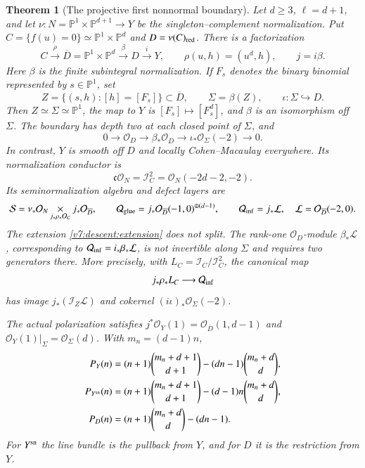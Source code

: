 \documentclass[10pt,fleqn]{article}
\numberwithin{equation}{section}
\newtheorem{theorem}{Theorem}[section]
\newcommand{\PP}{\mathbb P}
\begin{document}
\begin{theorem}[The projective first nonnormal boundary]
\label{v8r11:mixed:projective-first}
Let $d\ge3$, $\ell=d+1$, and let $\nu:N=\PP^1\times\PP^{d+1}\to Y$
be the singleton--complement normalization.  Put
$C=\{f(u)=0\}\simeq\PP^1\times\PP^d$ and $D=\nu(C)_{\rm red}$.
There is a factorization
\[
 C\xrightarrow{\rho}\overline D=\PP^1\times\PP^d
       \xrightarrow{\beta}D\xrightarrow{i}Y,
 \qquad \rho(u,h)=(u^d,h),\qquad j=i\beta.
\]
Here $\beta$ is the finite subintegral normalization.  If $F_s$ denotes
the binary binomial represented by $s\in\PP^1$, set
\[
 Z=\{(s,h):[h]=[F_s]\}\subset\overline D,\qquad
 \Sigma=\beta(Z),\qquad \iota:\Sigma\hookrightarrow D.
\]
Then $Z\simeq\Sigma\simeq\PP^1$, the map to $Y$ is $[F_s]\mapsto[F_s^d]$,
and $\beta$ is an isomorphism off $\Sigma$.  The boundary has depth two
at each closed point of $\Sigma$, and
\[
 0\longrightarrow\mathcal O_D\longrightarrow\beta_*\mathcal O_{\overline D}
   \longrightarrow\iota_*\mathcal O_\Sigma(-2)\longrightarrow0.
\]
In contrast, $Y$ is smooth off $D$ and locally Cohen--Macaulay everywhere.
Its normalization conductor is
\[
 \mathfrak c\mathcal O_N=\mathcal I_C^2
             =\mathcal O_N(-2d-2,-2).
\]
Its seminormalization algebra and defect layers are
\[
 \mathcal S=\nu_*\mathcal O_N
       \mathop{\times}_{j_*\rho_*\mathcal O_C}j_*\mathcal O_{\overline D},
 \qquad
 \mathcal Q_{\rm glue}=j_*\mathcal O_{\overline D}(-1,0)^{\oplus(d-1)},
 \qquad
 \mathcal Q_{\rm inf}=j_*\mathcal L,
 \quad \mathcal L=\mathcal O_{\overline D}(-2,0).
\]
The extension \eqref{v7:descent:extension} does not split.  The rank-one
$\mathcal O_D$-module $\beta_*\mathcal L$, corresponding to
$\mathcal Q_{\rm inf}=i_*\beta_*\mathcal L$, is not invertible along
$\Sigma$ and requires two generators there.  More
precisely, with $L_C=\mathcal I_C/\mathcal I_C^2$, the canonical map
\[
 j_*\rho_*L_C\longrightarrow\mathcal Q_{\rm inf}
\]
has image $j_*(\mathcal I_Z\mathcal L)$ and cokernel
$(i\iota)_*\mathcal O_\Sigma(-2)$.

The actual polarization satisfies
$j^*\mathcal O_Y(1)=\mathcal O_{\overline D}(1,d-1)$ and
$\mathcal O_Y(1)|_\Sigma=\mathcal O_\Sigma(d)$.  With $m_n=(d-1)n$,
\[
 \begin{aligned}
 P_Y(n)&=(n+1)\binom{m_n+d+1}{d+1}-(dn-1)\binom{m_n+d}{d},\\
 P_{Y^{\rm sn}}(n)&=(n+1)\binom{m_n+d+1}{d+1}-(d-1)n\binom{m_n+d}{d},\\
 P_D(n)&=(n+1)\binom{m_n+d}{d}-(dn-1).
 \end{aligned}
\]
For $Y^{\rm sn}$ the line bundle is the pullback from $Y$, and for $D$
it is the restriction from $Y$.
\end{theorem}
\end{document}

